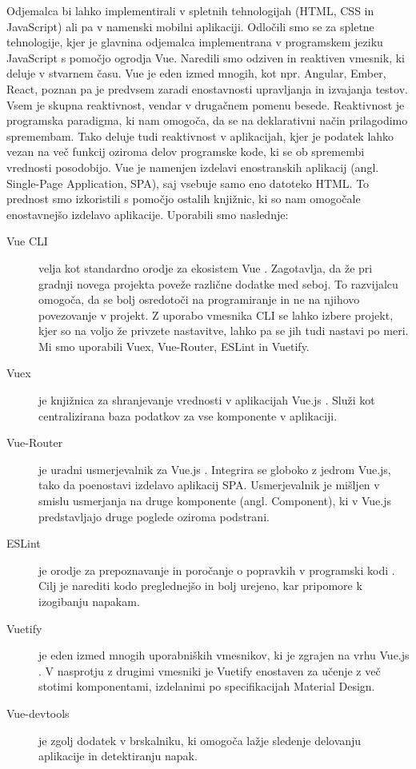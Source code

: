 \documentclass[a4paper, 12pt]{book}
\begin{document}
Odjemalca bi lahko implementirali v spletnih tehnologijah (HTML, CSS in JavaScript) ali pa v namenski mobilni aplikaciji. Odločili smo se za spletne tehnologije, kjer je glavnina odjemalca implementrana v programskem jeziku JavaScript s pomočjo ogrodja Vue.  Naredili smo odziven in reaktiven vmesnik, ki deluje v stvarnem času. Vue je eden izmed mnogih, kot npr. Angular, Ember, React, poznan pa je predvsem zaradi enostavnosti upravljanja in izvajanja testov. Vsem je skupna reaktivnost, vendar v drugačnem pomenu besede. Reaktivnost \cite{reaktivnost} je programska paradigma, ki nam omogoča, da se na deklarativni način prilagodimo spremembam. Tako deluje tudi reaktivnost v aplikacijah, kjer je podatek lahko vezan na več funkcij oziroma delov programske kode, ki se ob spremembi vrednosti posodobijo. Vue je namenjen izdelavi enostranskih aplikacij (angl. Single-Page Application, SPA), saj vsebuje samo eno datoteko HTML. To prednost smo izkoristili s pomočjo ostalih knjižnic, ki so nam omogočale enostavnejšo izdelavo aplikacije. Uporabili smo naslednje:
\begin{description}
\item[Vue CLI] velja kot standardno orodje za ekosistem Vue \cite{VueCLI}. Zagotavlja, da že pri gradnji novega projekta poveže različne dodatke med seboj. To razvijalcu omogoča, da se bolj osredotoči na programiranje in ne na njihovo povezovanje v projekt. Z uporabo vmesnika CLI se lahko izbere projekt, kjer so na voljo že privzete nastavitve, lahko pa se jih tudi nastavi po meri. Mi smo uporabili Vuex, Vue-Router, ESLint in Vuetify.
\item[Vuex] je knjižnica za shranjevanje vrednosti v aplikacijah Vue.js \cite{Vuex}. Služi kot centralizirana baza podatkov za vse komponente v aplikaciji. 
\item[Vue-Router] je uradni usmerjevalnik za Vue.js \cite{VueRouter}. Integrira se globoko z jedrom Vue.js, tako da poenostavi izdelavo aplikacij SPA. Usmerjevalnik je mišljen v smislu usmerjanja na druge komponente (angl. Component), ki v Vue.js predstavljajo druge poglede oziroma podstrani.
\item[ESLint] je orodje za prepoznavanje in poročanje o popravkih v programski kodi \cite{ESLint}. Cilj je narediti kodo preglednejšo in bolj urejeno, kar pripomore k izogibanju napakam.
\item[Vuetify] je eden izmed mnogih uporabniških vmesnikov, ki je zgrajen na vrhu Vue.js \cite{Vuetify}. V nasprotju z drugimi vmesniki je Vuetify enostaven za učenje z več stotimi komponentami, izdelanimi po specifikacijah Material Design.
\item[Vue-devtools] je zgolj dodatek v brskalniku, ki omogoča lažje sledenje delovanju aplikacije in detektiranju napak. 
\end{description}
\end{document}
